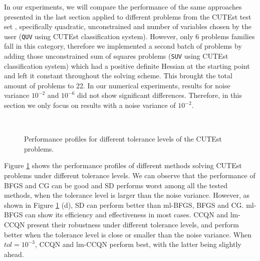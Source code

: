 \documentclass[11pt,twoside]{article}
\begin{document}
In our experiments, we will compare the performance of the same
approaches presented in the last section applied to different problems
from the CUTEst test set \cite{GOT15}, specifically quadratic,
unconstrained and number of variables chosen by the user (\texttt{QUV}
using CUTEst classification system). However, only 6 problems families
fall in this category, therefore we implemented a second batch of
problems by adding those unconstrained sum of squares problems
(\texttt{SUV} using CUTEst classification system) which had a positive
definite Hessian at the starting point and left it constant throughout
the solving scheme. This brought the total amount of problems to
22. In our numerical experiments, results for noise variance $10^{-2}$
and $10^{-6}$ did not show significant differences. Therefore, in this section we only focus on results with a noise variance of $10^{-2}$.

\begin{figure}[H]
                \centering
                \qquad
                \\
                \qquad
                \caption{Performance profiles for different tolerance levels of the CUTEst problems.}
                \label{graph:cute-pp1}
\end{figure}

Figure \ref{graph:cute-pp1} shows the performance profiles of different methods solving CUTEst problems under different tolerance levels.
We can observe that the performance of BFGS and CG can be good and SD performs worst among all the tested methods, when the tolerance level is larger than the noise variance.
However, as shown in Figure \ref{graph:cute-pp1} (d),
SD can perform better than ml-BFGS, BFGS and CG.
ml-BFGS can show its efficiency and effectiveness in most cases.
CCQN and lm-CCQN present their robustness under different tolerance levels, and perform better when the tolerance level is close or smaller than the noise variance.
When $tol = 10^{-3}$, CCQN and lm-CCQN perform best, with the latter being slightly ahead.
\end{document}
